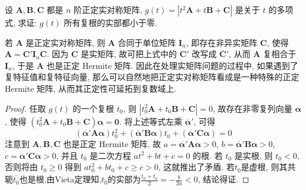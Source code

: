 \documentclass[../../main.tex]{subfiles}%
\begin{document}
\begin{example}
设 \(\boldsymbol{A},\boldsymbol{B},\boldsymbol{C}\) 都是 \(n\) 阶正定实对称矩阵, \(g(t)=|t^2\boldsymbol{A}+t\boldsymbol{B}+\boldsymbol{C}|\) 是关于 \(t\) 的多项式, 求证: \(g(t)\) 所有复根的实部都小于零.
\end{example}
\begin{remark}
若 \(\boldsymbol{A}\) 是正定实对称矩阵, 则 \(\boldsymbol{A}\) 合同于单位矩阵 \(\boldsymbol{I}_n\), 即存在非异实矩阵 \(\boldsymbol{C}\), 使得 \(\boldsymbol{A}=\boldsymbol{C}'\boldsymbol{I}_n\boldsymbol{C}\). 因为 \(\boldsymbol{C}\) 是实矩阵, 故可把上式中的 \(\boldsymbol{C}'\) 改写成 \(\overline{\boldsymbol{C}}'\), 从而 \(\boldsymbol{A}\) 复相合于 \(\boldsymbol{I}_n\), 于是 \(\boldsymbol{A}\) 也是正定 Hermite 矩阵. 因此在处理实矩阵问题的过程中, 如果遇到了复特征值和复特征向量, 那么可以自然地把正定实对称矩阵看成是一种特殊的正定 Hermite 矩阵, 从而其正定性可延拓到复数域上. 
\end{remark}
\begin{proof}
任取 \(g(t)\) 的一个复根 \(t_0\), 则 \(|t_0^2\boldsymbol{A}+t_0\boldsymbol{B}+\boldsymbol{C}| = 0\), 故存在非零复列向量 \(\boldsymbol{\alpha}\), 使得 \((t_0^2\boldsymbol{A}+t_0\boldsymbol{B}+\boldsymbol{C})\boldsymbol{\alpha}=\boldsymbol{0}\). 将上述等式左乘 \(\overline{\boldsymbol{\alpha}}'\), 可得
\[(\overline{\boldsymbol{\alpha}}'\boldsymbol{A}\boldsymbol{\alpha})t_0^2+(\overline{\boldsymbol{\alpha}}'\boldsymbol{B}\boldsymbol{\alpha})t_0+(\overline{\boldsymbol{\alpha}}'\boldsymbol{C}\boldsymbol{\alpha}) = 0\]
注意到 \(\boldsymbol{A},\boldsymbol{B},\boldsymbol{C}\) 也是正定 Hermite 矩阵, 故 \(a=\overline{\boldsymbol{\alpha}}'\boldsymbol{A}\boldsymbol{\alpha}>0\), \(b=\overline{\boldsymbol{\alpha}}'\boldsymbol{B}\boldsymbol{\alpha}>0\), \(c=\overline{\boldsymbol{\alpha}}'\boldsymbol{C}\boldsymbol{\alpha}>0\), 并且 \(t_0\) 是二次方程 \(at^2 + bt + c = 0\) 的根. 若 \(t_0\) 是实根, 则 \(t_0<0\), 否则将由 \(t_0\geqslant 0\) 得到 \(at_0^2+bt_0 + c\geqslant  c>0\), 这就推出了矛盾. 若\(t_0\)是虚根, 则其共轭$\overline{t_0}$也是根,由Vieta定理知,\(t_0\)的实部为\(\frac{t_0+\overline{t_0}}{2}=-\frac{b}{2a}<0\), 结论得证.
\end{proof}
\end{document}
